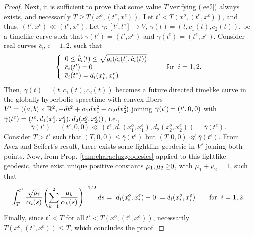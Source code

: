 \begin{proof}
Next, it is sufficient to prove that some value $T$
verifying (\ref{ee2}) always exists, and necessarily $T\geq T(x^o,(t^e,x^e))$. Let $t'<T(x^o,(t^e,x^e))$, and thus, $(t',x^{o})\ll (t^{e},x^{e})$.
Let $\gamma:[t',t^e]\rightarrow V$,
$\gamma(t)=(t,c_{1}(t), c_{2}(t))$, be a timelike curve such
that $\gamma(t')=(t',x^{o})$ and $\gamma(t^{e})=(t^{e},x^{e})$.
Consider real curves $\overline{c}_{i}$, $i=1,2$, such that
\[
\left\{\begin{array}{l} 0\leq\dot{\overline{c}}_{i}(t)\leq
\sqrt{g_{i}(\dot{c}_{i}(t),\dot{c}_{i}(t))} \\
\overline{c}_{i}(t')=0 \\
\overline{c}_{i}(t^{e})=d_{i}(x_{i}^{o},x_{i}^{e})
\end{array}\right. \qquad\hbox{for}\;\; i=1,2.
\]
Then, $\overline{\gamma}(t)=(t,\overline{c}_{1}(t),\overline{c}_{2}(t))$
becomes a future directed timelike curve in the globally hyperbolic \multiwarped
spacetime with convex fibers
$V'=({\color{black} (a,b)} \times {\mathbb R}^{2},-dt^{2}+\alpha_{1}dx_{1}^{2}+\alpha_{2}dx_{2}^{2})$ joining $\overline{\gamma}(t')=(t',0,0)$ with $\overline{\gamma}(t^e)=(t^e,d_{1}(x_{1}^o,x_{1}^{e}),d_{2}(x_{2}^o,x_{2}^e))$, i.e., \[\overline{\gamma}(t')=(t',0,0)\ll (t^e,d_{1}(x_{1}^o,x_{1}^{e}),d_{2}(x_{2}^o,x_{2}^{e}))=\overline{\gamma}(t^e).\]
Consider $T>t'$ such that $(T,0,0)\leq \overline{\gamma}(t^e)$ but $(T,0,0)\not\ll \overline{\gamma}(t^e)$. From
Avez and Seifert's result, there exists some lightlike geodesic in $V'$
joining both points. Now, from Prop. \ref{thm:characluzgeodesics} applied to this lightlike geodesic, there exist unique positive constants ${\color{black} \mu_1,\mu_2 \geq}0$, with $\mu_1+\mu_2=1$, such that
\[
\int_{T}^{t^{e}} \frac{\sqrt{\mu_{i}}}{\alpha_{i}(s)}\left(\sum_{k=1}^{2} \frac{\mu_{k}}{\alpha_{k}(s)} \right)^{-1/2}ds=|d_{i}(x^{o}_{i},x^{e}_{i})-0|=d_{i}(x^{o}_{i},x^{e}_{i}) \qquad\hbox{for}\;\;
i=1,2.
  \]
Finally, since $t'<T$ for all $t'<T(x^o,(t^e,x^e))$, necessarily $T(x^o,(t^e,x^e))\leq T$, which concludes the proof.

\end{proof}

